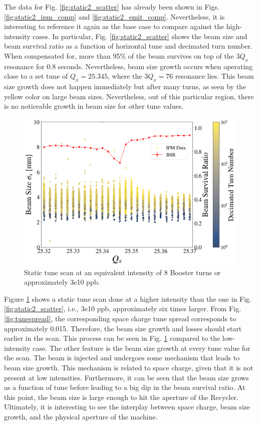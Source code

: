 The data for Fig. \ref{fig:static2_scatter} has already been shown in Figs. \ref{fig:static2_ipm_comp} and \ref{fig:static2_emit_comp}. Nevertheless, it is interesting to reference it again as the base case to compare against the high-intensity cases. In particular, Fig. \ref{fig:static2_scatter} shows the beam size and beam survival ratio as a function of horizontal tune and decimated turn number. When compensated for, more than 95\% of the beam survives on top of the $3Q_x$ resonance for 0.8 seconds. Nevertheless, beam size growth occurs when operating close to a set tune of $Q_x=25.345$, where the $3Q_x=76$ resonance lies. This beam size growth does not happen immediately but after many turns, as seen by the yellow color on large beam sizes. Nevertheless, out of this particular region, there is no noticeable growth in beam size for other tune values.

\begin{figure}[H]
    \centering
    \includegraphics[width=\columnwidth]{chapter6/static8turns_dampersOFF.png}
    \caption{Static tune scan at an equivalent intensity of 8 Booster turns or approximately 3e10 ppb.}
    \label{fig:static8_scatter}
\end{figure}

Figure \ref{fig:static8_scatter} shows a static tune scan done at a higher intensity than the one in Fig. \ref{fig:static2_scatter}, i.e., 3e10 ppb, approximately six times larger. From Fig. \ref{fig:tunespread}, the corresponding space charge tune spread corresponds to approximately 0.015. Therefore, the beam size growth and losses should start earlier in the scan. This process can be seen in Fig. \ref{fig:static8_scatter} compared to the low-intensity case. The other feature is the beam size growth at every tune value for the scan. The beam is injected and undergoes some mechanism that leads to beam size growth. This mechanism is related to space charge, given that it is not present at low intensities. Furthermore, it can be seen that the beam size grows as a function of tune before leading to a big dip in the beam survival ratio. At this point, the beam size is large enough to hit the aperture of the Recycler. Ultimately, it is interesting to see the interplay between space charge, beam size growth, and the physical aperture of the machine.      

